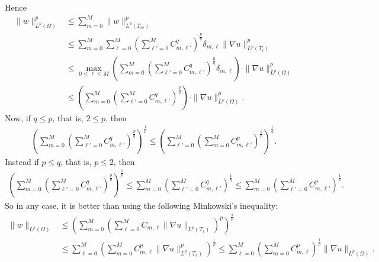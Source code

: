 \documentclass[10pt,a4paper]{article}
\begin{document}
\begin{remark}
    \color{green}Hence 
    \begin{align}
        \| w \|_{L^{p}(\Omega)}^{p}
        &
        \leq 
        \sum_{m=0}^{M}
        \| w \|_{L^{p}(T_{m})}^{p}
        \\&
        \leq 
        \sum_{m=0}^{M}
        \sum_{\ell=0}^{M} 
        \left( \sum_{\ell'=0}^{M} C_{m,\ell'}^{q} \right)^{\frac p q}
        \delta_{m,\ell} \| \nabla u \|_{L^{p}(T_{\ell})}^{p} 
        \\&
        \leq 
        \max_{0 \leq \ell \leq M} \left(
            \sum_{m=0}^{M}
            \left( \sum_{\ell'=0}^{M} C_{m,\ell'}^{q} \right)^{\frac p q}
            \delta_{m,\ell} 
        \right)
        \cdot 
        \| \nabla u \|_{L^{p}(\Omega)}^{p} 
        \\&
        \leq 
        \left(
            \sum_{m=0}^{M}
            \left( \sum_{\ell'=0}^{M} C_{m,\ell'}^{q} \right)^{\frac p q}
        \right)
        \cdot 
        \| \nabla u \|_{L^{p}(\Omega)}^{p} 
        .
    \end{align}
    Now, if $q \leq p$, that is, $2 \leq p$, then 
    \begin{align}
        \left(
            \sum_{m=0}^{M}
            \left( \sum_{\ell'=0}^{M} C_{m,\ell'}^{q} \right)^{\frac p q}
        \right)^{\frac 1 p}
        \leq 
        \left(
            \sum_{\ell'=0}^{M}
            \left( \sum_{m=0}^{M} C_{m,\ell'}^{p} \right)^{\frac q p}
        \right)^{\frac 1 q}
        .
    \end{align}
    Instead if $p \leq q$, that is, $p \leq 2$, then 
    \begin{align}
        \left(
            \sum_{m=0}^{M}
            \left( \sum_{\ell'=0}^{M} C_{m,\ell'}^{q} \right)^{\frac p q}
        \right)^{\frac 1 p}
        \leq 
        \sum_{m=0}^{M}
        \left( \sum_{\ell'=0}^{M} C_{m,\ell'}^{q} \right)^{\frac 1 q}
        \leq 
        \sum_{m=0}^{M}
        \left( \sum_{\ell'=0}^{M} C_{m,\ell'}^{p} \right)^{\frac 1 p}
        .
    \end{align}
    So in any case, it is better than using the following Minkowski's inequality: 
    \begin{align}
        \| w \|_{L^{p}(\Omega)}
        &
        \leq 
        \left( \sum_{m=0}^{M} \left( \sum_{\ell=0}^{M} C_{m,\ell} \| \nabla u \|_{L^{p}(T_{\ell})} \right)^{p} \right)^{\frac 1 p}
        \\&
        \leq 
        \sum_{\ell=0}^{M}
        \left( \sum_{m=0}^{M} C_{m,\ell}^{p} \| \nabla u \|_{L^{p}(T_{\ell})}^{p} \right)^{\frac 1 p}
        \leq 
        \sum_{\ell=0}^{M}
        \left( \sum_{m=0}^{M} C_{m,\ell}^{p} \right)^{\frac 1 p}
        \| \nabla u \|_{L^{p}(\Omega)}
        .
    \end{align}
\end{remark}
\end{document}
